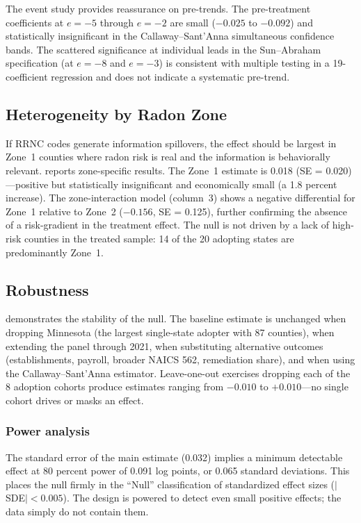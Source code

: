\documentclass[12pt]{article}
\begin{document}
The event study provides reassurance on pre-trends. The pre-treatment coefficients at $e = -5$ through $e = -2$ are small ($-0.025$ to $-0.092$) and statistically insignificant in the Callaway--Sant'Anna simultaneous confidence bands. The scattered significance at individual leads in the Sun--Abraham specification (at $e = -8$ and $e = -3$) is consistent with multiple testing in a 19-coefficient regression and does not indicate a systematic pre-trend.

\subsection{Heterogeneity by Radon Zone}



If RRNC codes generate information spillovers, the effect should be largest in Zone~1 counties where radon risk is real and the information is behaviorally relevant.  reports zone-specific results. The Zone~1 estimate is 0.018 (SE = 0.020)---positive but statistically insignificant and economically small (a 1.8 percent increase). The zone-interaction model (column~3) shows a negative differential for Zone~1 relative to Zone~2 ($-0.156$, SE = 0.125), further confirming the absence of a risk-gradient in the treatment effect. The null is not driven by a lack of high-risk counties in the treated sample: 14 of the 20 adopting states are predominantly Zone~1.

\subsection{Robustness}



 demonstrates the stability of the null. The baseline estimate is unchanged when dropping Minnesota (the largest single-state adopter with 87 counties), when extending the panel through 2021, when substituting alternative outcomes (establishments, payroll, broader NAICS 562, remediation share), and when using the Callaway--Sant'Anna estimator. Leave-one-out exercises dropping each of the 8 adoption cohorts produce estimates ranging from $-0.010$ to $+0.010$---no single cohort drives or masks an effect.

\subsubsection*{Power analysis} The standard error of the main estimate (0.032) implies a minimum detectable effect at 80 percent power of 0.091 log points, or 0.065 standard deviations. This places the null firmly in the ``Null'' classification of standardized effect sizes ($|$SDE$| < 0.005$). The design is powered to detect even small positive effects; the data simply do not contain them.
\end{document}
